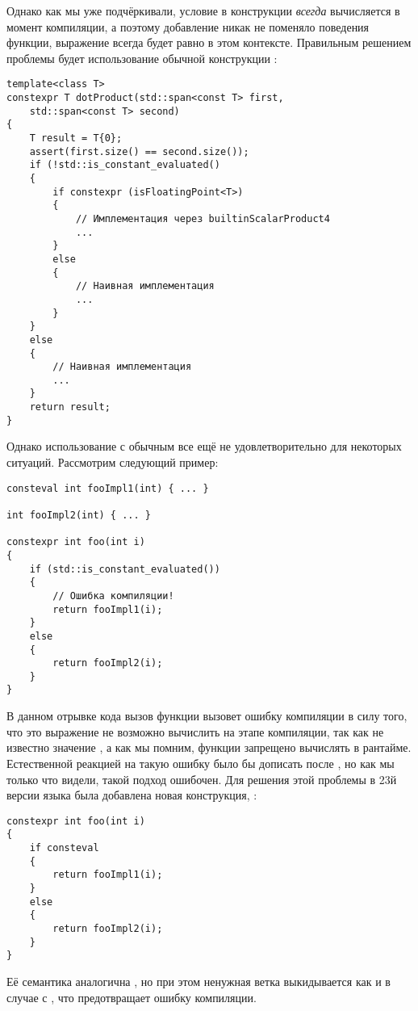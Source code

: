 Однако как мы уже подчёркивали, условие в конструкции  \textit{всегда} вычисляется в момент компиляции, а поэтому добавление  никак не поменяло поведения функции, выражение  всегда будет равно  в этом контексте. Правильным решением проблемы будет использование обычной конструкции :
\begin{verbatim}
template<class T>
constexpr T dotProduct(std::span<const T> first,
    std::span<const T> second)
{
    T result = T{0};
    assert(first.size() == second.size());
    if (!std::is_constant_evaluated()
    {
        if constexpr (isFloatingPoint<T>)
        {
            // Имплементация через builtinScalarProduct4
            ...
        }
        else
        {
            // Наивная имплементация
            ...
        }
    }
    else
    {
        // Наивная имплементация
        ...
    }
    return result;
}
\end{verbatim}
Однако использование  с обычным  все ещё не удовлетворительно для некоторых ситуаций. Рассмотрим следующий пример:
\begin{verbatim}
consteval int fooImpl1(int) { ... }

int fooImpl2(int) { ... }

constexpr int foo(int i)
{
    if (std::is_constant_evaluated())
    {
        // Ошибка компиляции!
        return fooImpl1(i);
    }
    else
    {
        return fooImpl2(i);
    }
}
\end{verbatim}
В данном отрывке кода вызов функции  вызовет ошибку компиляции в силу того, что это выражение не возможно вычислить на этапе компиляции, так как не известно значение , а как мы помним,  функции запрещено вычислять в рантайме. Естественной реакцией на такую ошибку было бы дописать  после , но как мы только что видели, такой подход ошибочен. Для решения этой проблемы в 23й версии языка была добавлена новая конструкция, :
\begin{verbatim}
constexpr int foo(int i)
{
    if consteval
    {
        return fooImpl1(i);
    }
    else
    {
        return fooImpl2(i);
    }
}
\end{verbatim}
Её семантика аналогична , но при этом ненужная ветка выкидывается как и в случае с , что предотвращает ошибку компиляции.


